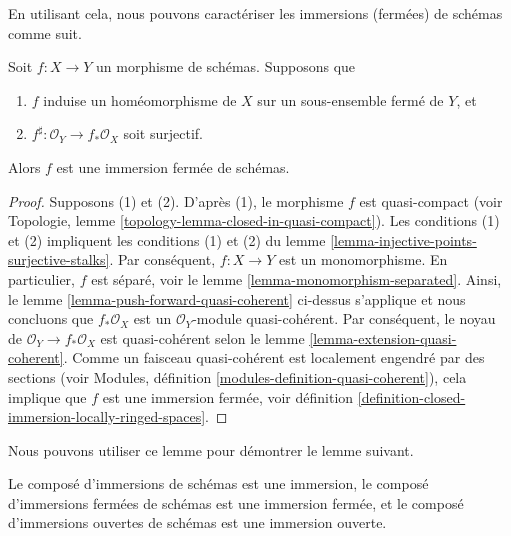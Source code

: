 \noindent
En utilisant cela, nous pouvons caractériser les immersions (fermées) de schémas
comme suit.

\begin{lemma}
\label{lemma-characterize-closed-immersions}
Soit $f : X \to Y$ un morphisme de schémas.
Supposons que
\begin{enumerate}
\item $f$ induise un homéomorphisme de $X$ sur un
sous-ensemble fermé de $Y$,
et \item $f^\sharp : \mathcal{O}_Y \to f_*\mathcal{O}_X$
soit surjectif.
\end{enumerate}
Alors $f$ est une immersion fermée de schémas.
\end{lemma}

\begin{proof}
Supposons (1) et (2). D'après (1), le morphisme $f$ est quasi-compact
(voir Topologie, lemme \ref{topology-lemma-closed-in-quasi-compact}).
Les conditions (1) et (2) impliquent les conditions (1) et (2)
du lemme \ref{lemma-injective-points-surjective-stalks}.
Par conséquent, $f : X \to Y$ est un monomorphisme. En particulier,
$f$ est séparé, voir le lemme \ref{lemma-monomorphism-separated}.
Ainsi, le lemme \ref{lemma-push-forward-quasi-coherent}
ci-dessus s'applique et nous concluons que $f_*\mathcal{O}_X$ est un
$\mathcal{O}_Y$-module quasi-cohérent. Par conséquent, le noyau
de $\mathcal{O}_Y \to f_*\mathcal{O}_X$ est quasi-cohérent
selon le lemme \ref{lemma-extension-quasi-coherent}. Comme un faisceau
quasi-cohérent est localement engendré par des
sections (voir Modules, définition \ref{modules-definition-quasi-coherent}),
cela implique que $f$ est une immersion fermée,
voir définition \ref{definition-closed-immersion-locally-ringed-spaces}.
\end{proof}

\noindent
Nous pouvons utiliser ce lemme pour démontrer le lemme suivant.

\begin{lemma}
\label{lemma-composition-immersion}
Le composé d'immersions de schémas est une immersion, le
composé d'immersions fermées de schémas est une immersion fermée, et le
composé d'immersions ouvertes de schémas est une immersion ouverte.
\end{lemma}

